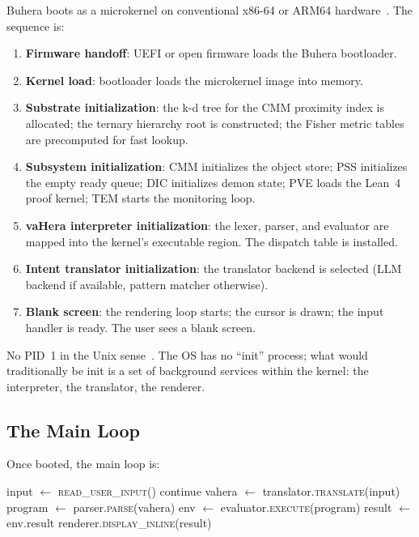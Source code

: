 \documentclass[11pt,twocolumn,a4paper]{article}
\begin{document}
Buhera boots as a microkernel on conventional x86-64 or ARM64 hardware~\cite{hennessy2011computer}. The sequence is:

\begin{enumerate}[leftmargin=*]
\item \textbf{Firmware handoff}: UEFI or open firmware loads the Buhera bootloader.
\item \textbf{Kernel load}: bootloader loads the microkernel image into memory.
\item \textbf{Substrate initialization}: the k-d tree for the CMM proximity index is allocated; the ternary hierarchy root is constructed; the Fisher metric tables are precomputed for fast lookup.
\item \textbf{Subsystem initialization}: CMM initializes the object store; PSS initializes the empty ready queue; DIC initializes demon state; PVE loads the Lean~4 proof kernel; TEM starts the monitoring loop.
\item \textbf{vaHera interpreter initialization}: the lexer, parser, and evaluator are mapped into the kernel's executable region. The dispatch table is installed.
\item \textbf{Intent translator initialization}: the translator backend is selected (LLM backend if available, pattern matcher otherwise).
\item \textbf{Blank screen}: the rendering loop starts; the cursor is drawn; the input handler is ready. The user sees a blank screen.
\end{enumerate}

No PID~1 in the Unix sense~\cite{ritchie1974unix}. The OS has no ``init'' process; what would traditionally be init is a set of background services within the kernel: the interpreter, the translator, the renderer.

\subsection{The Main Loop}

Once booted, the main loop is:

\begin{algorithm}[H]
\caption{Buhera main loop}
\begin{algorithmic}[1]
\Loop
  \State input $\leftarrow$ \textsc{read\_user\_input}()
    \State continue
  \EndIf
  \State vahera $\leftarrow$ translator.\textsc{translate}(input)
  \State program $\leftarrow$ parser.\textsc{parse}(vahera)
  \State env $\leftarrow$ evaluator.\textsc{execute}(program)
  \State result $\leftarrow$ env.result
  \State renderer.\textsc{display\_inline}(result)
\EndLoop
\end{algorithmic}
\end{algorithm}
\end{document}
